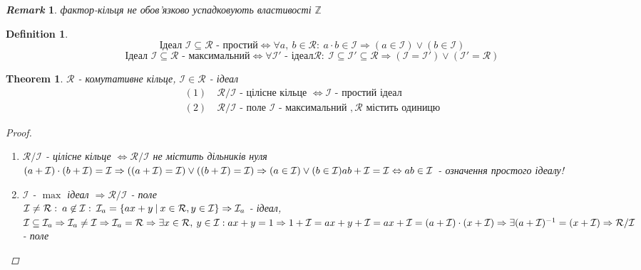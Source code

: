 \documentclass[a4paper,12pt, centered]{bookest}
\newtheorem{theorem}{Theorem}[section]
\newtheorem{definition}{Definition}[section]
\newtheorem*{remark*}{\emph{Remark}}
\begin{document}
\begin{remark*}
	фактор-кільця не обов'язково успадковують властивості $\mathbb{Z}$
\end{remark*}
\begin{definition}
	$$\textrm{Ідеал }\mathcal{I}\subseteq\mathcal{R}\textrm{ - простий}\Leftrightarrow\forall a,\>b\in\mathcal{R}:\>a\cdot b\in\mathcal{I}\Rightarrow(a\in\mathcal{I})\lor(b\in\mathcal{I})$$
	$$\textrm{Ідеал }\mathcal{I}\subseteq\mathcal{R}\textrm{ - максимальний}\Leftrightarrow\forall \mathcal{I}'\textrm{ - ідеал}\mathcal{R}:\>\mathcal{I}\subseteq\mathcal{I}'\subseteq\mathcal{R}\Rightarrow(\mathcal{I}=\mathcal{I}')\lor(\mathcal{I}'=\mathcal{R})$$
\end{definition}
\begin{theorem}$\mathcal{R}$ - комутативне кільце, $\mathcal{I}\in\mathcal{R}$ - ідеал
	\begin{align*}
		(1)&\>\mathcal{R}/\mathcal{I} \textrm{ - цілісне кільце }\Leftrightarrow\mathcal{I}\textrm{ - простий ідеал}\\
		(2)&\>\mathcal{R}/\mathcal{I}\textrm{ - поле }\mathcal{I}\textrm{ - максимальний },\mathcal{R}\textrm{ містить одиницю}
	\end{align*}
	\begin{proof}$ $
		\begin{enumerate}[(1)]
			\item $\mathcal{R}/\mathcal{I}$ - цілісне кільце $\Leftrightarrow \mathcal{R}/\mathcal{I}$ не містить дільників нуля\\$(a+\mathcal{I})\cdot(b+\mathcal{I})=\mathcal{I}\Rightarrow((a+\mathcal{I})=\mathcal{I})\lor((b+\mathcal{I})=\mathcal{I})\Rightarrow(a\in\mathcal{I})\lor(b\in\mathcal{I})\\ab+\mathcal{I}=\mathcal{I}\Leftrightarrow ab\in\mathcal{I}$ - означення простого ідеалу!	
			\item $\mathcal{I}$ - $\max$ ідеал $\Rightarrow\mathcal{R}/\mathcal{I}$ - поле\\$\mathcal{I}\neq\mathcal{R}:\>a\not\in\mathcal{I}:\>\mathcal{I}_a=\{ax+y\>|\>x\in\mathcal{R},y\in\mathcal{I}\}\\\Rightarrow\mathcal{I}_a$ - ідеал, $\mathcal{I}\subseteq\mathcal{I}_a\Rightarrow\mathcal{I}_a\neq\mathcal{I}\Rightarrow\mathcal{I}_a=\mathcal{R}\Rightarrow\exists x\in\mathcal{R},\>y\in\mathcal{I}:ax+y=1\\\Rightarrow1+\mathcal{I}=ax+y+\mathcal{I}=ax+\mathcal{I}=(a+\mathcal{I})\cdot(x+\mathcal{I})\Rightarrow\exists(a+\mathcal{I})^{-1}=(x+\mathcal{I})\\\Rightarrow\mathcal{R}/\mathcal{I}$ - поле 
		\end{enumerate}
	\end{proof}
\end{theorem}
\end{document}
